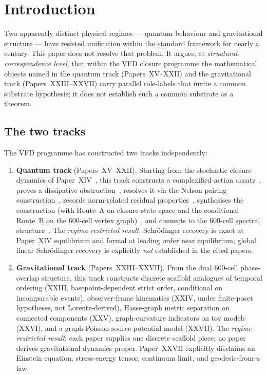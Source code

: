 \documentclass[12pt]{article}
\begin{document}
\section{Introduction}\label{sec:intro}

Two apparently distinct physical regimes --- quantum behaviour and gravitational structure --- have resisted unification within the standard framework for nearly a century. This paper does not resolve that problem. It argues, at \emph{structural-correspondence level}, that within the VFD closure programme the mathematical objects named in the quantum track (Papers~XV--XXII) and the gravitational track (Papers~XXIII--XXVII) carry parallel role-labels that invite a common substrate hypothesis; it does not establish such a common substrate as a theorem.

\subsection*{The two tracks}

The VFD programme has constructed two tracks independently:

\begin{enumerate}
    \item \textbf{Quantum track} (Papers~XV--XXII). Starting from the stochastic closure dynamics of Paper~XIV~\citep{SmartXIV}, this track constructs a complexified-action ansatz~\citep{SmartXV}, proves a dissipative obstruction~\citep{SmartXVII}, resolves it via the Nelson pairing construction~\citep{SmartXVIII}, records norm-related residual properties~\citep{SmartXIX,SmartXX}, synthesises the construction (with Route~A on closure-state space and the conditional Route~B on the 600-cell vertex graph)~\citep{SmartXXI}, and connects to the 600-cell spectral structure~\citep{SmartXXII}. The \emph{regime-restricted result}: Schr\"odinger recovery is exact at Paper~XIV equilibrium and formal at leading order near equilibrium; global linear Schr\"odinger recovery is explicitly \emph{not} established in the cited papers.

    \item \textbf{Gravitational track} (Papers~XXIII--XXVII). From the dual 600-cell phase-overlap structure, this track constructs discrete scaffold analogues of temporal ordering (XXIII, basepoint-dependent strict order, conditional on incomparable events), observer-frame kinematics (XXIV, under finite-poset hypotheses, not Lorentz-derived), Hasse-graph metric separation on connected components (XXV), graph-curvature indicators on toy models (XXVI), and a graph-Poisson source-potential model (XXVII). The \emph{regime-restricted result}: each paper supplies one discrete scaffold piece; no paper derives gravitational dynamics proper. Paper~XXVII explicitly disclaims an Einstein equation, stress-energy tensor, continuum limit, and geodesic-from-$u$ law.
\end{enumerate}
\end{document}
